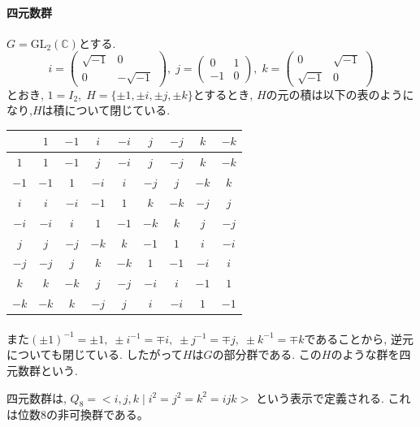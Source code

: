 \paragraph*{四元数群}
$G=\mathrm{GL}_2(\mathbb{C})$とする.
\[ i=\begin{pmatrix} \sqrt{-1} & 0 \\ 0 & -\sqrt{-1} \end{pmatrix},\;
j= \begin{pmatrix} 0 & 1 \\ -1 & 0 \end{pmatrix} , \; 
k=\begin{pmatrix} 0 & \sqrt{-1} \\ \sqrt{-1} & 0 \end{pmatrix}\]
とおき,
$1=I_2,\; H=\{\pm 1, \pm i, \pm j, \pm k\}$とするとき, 
$H$の元の積は以下の表のようになり,$H$は積について閉じている.\\

\begin{tabular}{c|cccccccc}
 & $1$ & $-1$ & $i$ & $-i$ & $j$ & $-j$& $k$ & $-k$ \\ \hline
$1$ & $1$ & $-1$ & $j$ & $-i$ & $j$ & $-j$ & $k$ & $-k$ \\
$-1$ & $-1$ & $1$ & $-i$ & $i$ & $-j$ & $j$ & $-k$ & $k$ \\
$i$ & $i$ & $-i$ & $-1$ & $1$ & $k$ & $-k$ & $-j$ & $j$ \\
$-i$ & $-i$ & $i$ & $1$ & $-1$ & $-k$ & $k$ & $j$ & $-j$ \\
$j$ & $j$ & $-j$ & $-k$ & $k$ & $-1$ & $1$ & $i$ & $-i$ \\
$-j$ & $-j$ & $j$ & $k$ & $-k$ & $1$ & $-1$ & $-i$ & $i$ \\
$k$ & $k$ & $-k$ & $j$ & $-j$ & $-i$ & $i$ & $-1$ & $1$ \\
$-k$ & $-k$ & $k$ & $-j$ & $j$ & $i$ & $-i$ & $1$ & $-1$ \\ \hline
\end{tabular}

\paragraph*{}
また$ (\pm 1)^{-1}=\pm 1,\;  \pm i^{-1} = \mp i,\; \pm j^{-1} = \mp j,\; \pm k^{-1} = \mp k $であることから, 逆元についても閉じている.
したがって$H$は$G$の部分群である. この$H$のような群を四元数群という.

四元数群は, 
$ Q_8 = <i,j,k \mid i^2=j^2=k^2=ijk>$
という表示で定義される. これは位数8の非可換群である。\\


